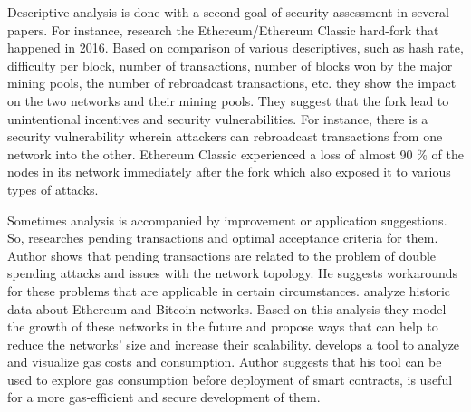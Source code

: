 Descriptive analysis is done with a second goal of security assessment in several papers. 
For instance, \cite{kiffer2017stick} research the Ethereum/Ethereum Classic hard-fork that happened in 2016. 
Based on comparison of various descriptives, such as hash rate, difficulty per block, number of transactions, number of blocks won by the major mining pools, the number of rebroadcast transactions, etc. they show the impact on the two networks and their mining pools.
They suggest that the fork lead to unintentional incentives and security vulnerabilities. 
For instance, there is a security vulnerability wherein attackers can rebroadcast transactions from one network into the other.
Ethereum Classic experienced a loss of almost 90 \% of the nodes in its network immediately after the fork which also exposed it to various types of attacks.

Sometimes analysis is accompanied by improvement or application suggestions. 
So, \cite{bentkeanalysis} researches pending transactions and optimal acceptance criteria for them. 
Author shows that pending transactions are related to the problem of double spending attacks and issues with the network topology.
He suggests workarounds for these problems that are applicable in certain circumstances.  
\cite{dennis2019analysis} analyze historic data about Ethereum and Bitcoin networks. 
Based on this analysis they model the growth of these networks in the future and propose ways that can help to reduce the networks' size and increase their scalability.
\cite{signer2018gas} develops a tool to analyze and visualize gas costs and consumption.
Author suggests that his tool can be used to explore gas consumption before deployment of smart contracts, is useful for a more gas-efficient and secure development of them. 



